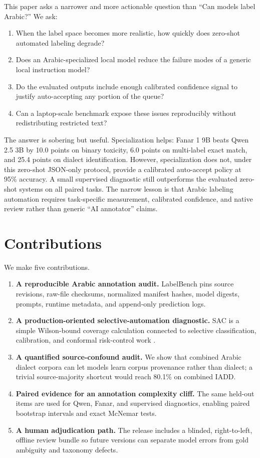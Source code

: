 \documentclass[10pt,twocolumn]{article}
\begin{document}
This paper asks a narrower and more actionable question than ``Can models label
Arabic?'' We ask:
\begin{enumerate}
  \item When the label space becomes more realistic, how quickly does
  zero-shot automated labeling degrade?
  \item Does an Arabic-specialized local model reduce the failure modes of a
  generic local instruction model?
  \item Do the evaluated outputs include enough calibrated confidence signal to
  justify auto-accepting any portion of the queue?
  \item Can a laptop-scale benchmark expose these issues reproducibly without
  redistributing restricted text?
\end{enumerate}

The answer is sobering but useful. Specialization helps: Fanar 1 9B beats Qwen
2.5 3B by 10.0 points on binary toxicity, 6.0 points on multi-label exact
match, and 25.4 points on dialect identification. However, specialization does
not, under this zero-shot JSON-only protocol, provide a calibrated auto-accept
policy at 95\% accuracy. A small supervised diagnostic still outperforms the
evaluated zero-shot systems on all paired tasks. The narrow lesson is that
Arabic labeling automation requires task-specific measurement, calibrated
confidence, and native review rather than generic ``AI annotator'' claims.

\section{Contributions}
We make five contributions.
\begin{enumerate}
  \item \textbf{A reproducible Arabic annotation audit.} LabelBench pins
  source revisions, raw-file checksums, normalized manifest hashes, model
  digests, prompts, runtime metadata, and append-only prediction logs.
  \item \textbf{A production-oriented selective-automation diagnostic.} SAC is
  a simple Wilson-bound coverage calculation connected to selective
  classification, calibration, and conformal risk-control work
  \citep{geifman2017selective,guo2017calibration,angelopoulos2024conformal}.
  \item \textbf{A quantified source-confound audit.} We show that combined
  Arabic dialect corpora can let models learn corpus provenance rather than
  dialect; a trivial source-majority shortcut would reach 80.1\% on combined
  IADD.
  \item \textbf{Paired evidence for an annotation complexity cliff.} The same
  held-out items are used for Qwen, Fanar, and supervised diagnostics, enabling
  paired bootstrap intervals and exact McNemar tests.
  \item \textbf{A human adjudication path.} The release includes a blinded,
  right-to-left, offline review bundle so future versions can separate model
  errors from gold ambiguity and taxonomy defects.
\end{enumerate}
\end{document}
